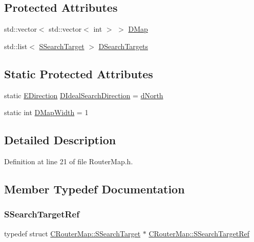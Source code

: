 \subsection*{Protected Attributes}
\begin{DoxyCompactItemize}
\item 
std\+::vector$<$ std\+::vector$<$ int $>$ $>$ \hyperlink{classCRouterMap_a313fe70c998e9e3f22753d47075af1a6}{D\+Map}
\item 
std\+::list$<$ \hyperlink{structCRouterMap_1_1SSearchTarget}{S\+Search\+Target} $>$ \hyperlink{classCRouterMap_a903a8d0891e61b169e6aa72da27d62ba}{D\+Search\+Targets}
\end{DoxyCompactItemize}
\subsection*{Static Protected Attributes}
\begin{DoxyCompactItemize}
\item 
static \hyperlink{GameDataTypes_8h_acb2b033915f6659a71a38b5aa6e4eb42}{E\+Direction} \hyperlink{classCRouterMap_addf4151d25670daf5cb45058e978fde2}{D\+Ideal\+Search\+Direction} = \hyperlink{GameDataTypes_8h_acb2b033915f6659a71a38b5aa6e4eb42a74d0139aee571cee88ff1393bbc6999e}{d\+North}
\item 
static int \hyperlink{classCRouterMap_a9899b7a017d376a16af153f6f91159d3}{D\+Map\+Width} = 1
\end{DoxyCompactItemize}


\subsection{Detailed Description}


Definition at line 21 of file Router\+Map.\+h.



\subsection{Member Typedef Documentation}
\hypertarget{classCRouterMap_a6996ef024b965180f73c433ba6f50154}{}\label{classCRouterMap_a6996ef024b965180f73c433ba6f50154} 
\subsubsection{\texorpdfstring{S\+Search\+Target\+Ref}{SSearchTargetRef}}
{\footnotesize\ttfamily typedef  struct \hyperlink{structCRouterMap_1_1SSearchTarget}{C\+Router\+Map\+::\+S\+Search\+Target} $\ast$ \hyperlink{classCRouterMap_a6996ef024b965180f73c433ba6f50154}{C\+Router\+Map\+::\+S\+Search\+Target\+Ref}\hspace{0.3cm}{\ttfamily [protected]}}



